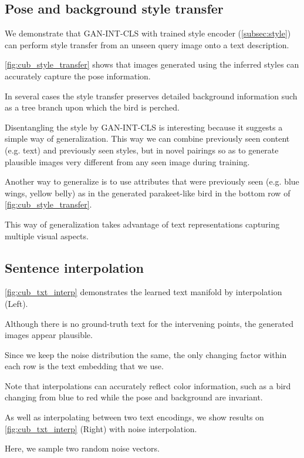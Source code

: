 \subsection{Pose and background style transfer}

We demonstrate that GAN-INT-CLS with trained style encoder (\autoref{subsec:style}) can perform style transfer from an unseen query image onto a text description.

\autoref{fig:cub_style_transfer} shows that images generated using the inferred styles can accurately capture the pose information.

In several cases the style transfer preserves detailed background information such as a tree branch upon which the bird is perched.

Disentangling the style by GAN-INT-CLS is interesting because it suggests a simple way of generalization. This way we can combine previously seen content (e.g. text) and previously seen styles, but in novel pairings so as to generate plausible images very different from any seen image during training.

Another way to generalize is to use attributes that were previously seen (e.g. blue wings, yellow belly) as in the generated parakeet-like bird in the bottom row of \autoref{fig:cub_style_transfer}.

This way of generalization takes advantage of text representations capturing multiple visual aspects.

\subsection{Sentence interpolation} 

\autoref{fig:cub_txt_interp} demonstrates the learned text manifold by interpolation (Left).

Although there is no ground-truth text for the intervening points, the generated images appear plausible.

Since we keep the noise distribution the same, the only changing factor within each row is the text embedding that we use. 

Note that interpolations can accurately reflect color information, such as a bird changing from blue to red while the pose and background are invariant.

As well as interpolating between two text encodings, we show results on \autoref{fig:cub_txt_interp} (Right) with noise interpolation.

Here, we sample two random noise vectors. 

